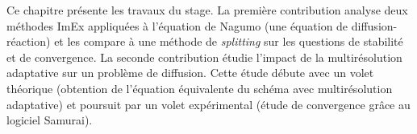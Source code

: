 Ce chapitre présente les travaux du stage.
La première contribution analyse deux méthodes ImEx appliquées à l'équation de Nagumo (une équation de diffusion-réaction)
et les compare à une méthode de \textit{splitting} sur les questions de stabilité et de convergence.
La seconde contribution étudie l'impact de la multirésolution adaptative sur un problème de diffusion.
Cette étude débute avec un volet théorique (obtention de l'équation équivalente du schéma avec multirésolution adaptative) 
et poursuit par un volet expérimental (étude de convergence grâce au logiciel Samurai).